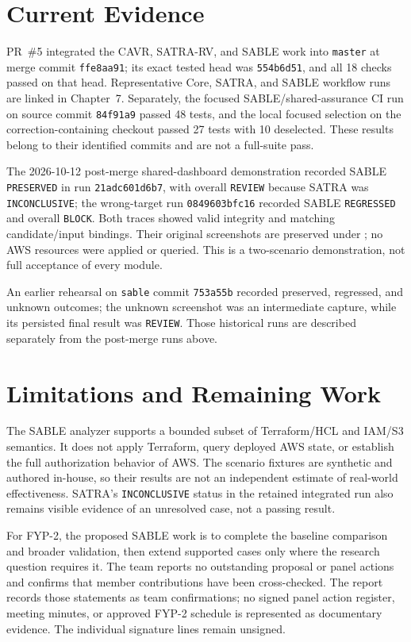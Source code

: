 \section*{Current Evidence}
PR~\#5 integrated the CAVR, SATRA-RV, and SABLE work into \texttt{master} at merge commit \texttt{ffe8aa91}; its exact tested head was \texttt{554b6d51}, and all 18 checks passed on that head. Representative Core, SATRA, and SABLE workflow runs are linked in Chapter~7. Separately, the focused SABLE/shared-assurance CI run on source commit \texttt{84f91a9} passed 48 tests, and the local focused selection on the correction-containing checkout passed 27 tests with 10 deselected. These results belong to their identified commits and are not a full-suite pass.

The 2026-10-12 post-merge shared-dashboard demonstration recorded SABLE \texttt{PRESERVED} in run \texttt{21adc601d6b7}, with overall \texttt{REVIEW} because SATRA was \texttt{INCONCLUSIVE}; the wrong-target run \texttt{0849603bfc16} recorded SABLE \texttt{REGRESSED} and overall \texttt{BLOCK}. Both traces showed valid integrity and matching candidate/input bindings. Their original screenshots are preserved under ; no AWS resources were applied or queried. This is a two-scenario demonstration, not full acceptance of every module.

An earlier rehearsal on \texttt{sable} commit \texttt{753a55b} recorded preserved, regressed, and unknown outcomes; the unknown screenshot was an intermediate capture, while its persisted final result was \texttt{REVIEW}. Those historical runs are described separately from the post-merge runs above.

\section*{Limitations and Remaining Work}
The SABLE analyzer supports a bounded subset of Terraform/HCL and IAM/S3 semantics. It does not apply Terraform, query deployed AWS state, or establish the full authorization behavior of AWS. The scenario fixtures are synthetic and authored in-house, so their results are not an independent estimate of real-world effectiveness. SATRA's \texttt{INCONCLUSIVE} status in the retained integrated run also remains visible evidence of an unresolved case, not a passing result.

For FYP-2, the proposed SABLE work is to complete the baseline comparison and broader validation, then extend supported cases only where the research question requires it. The team reports no outstanding proposal or panel actions and confirms that member contributions have been cross-checked. The report records those statements as team confirmations; no signed panel action register, meeting minutes, or approved FYP-2 schedule is represented as documentary evidence. The individual signature lines remain unsigned.
